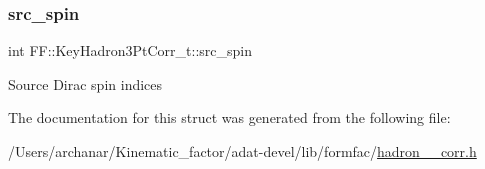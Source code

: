 \subsubsection{\texorpdfstring{src\_spin}{src\_spin}}
{\footnotesize\ttfamily int F\+F\+::\+Key\+Hadron3\+Pt\+Corr\+\_\+t\+::src\+\_\+spin}

Source Dirac spin indices 

The documentation for this struct was generated from the following file\+:\begin{DoxyCompactItemize}
\item 
/\+Users/archanar/\+Kinematic\+\_\+factor/adat-\/devel/lib/formfac/\mbox{\hyperlink{adat-devel_2lib_2formfac_2hadron__3pt__corr_8h}{hadron\+\_\+3pt\+\_\+corr.\+h}}\end{DoxyCompactItemize}
